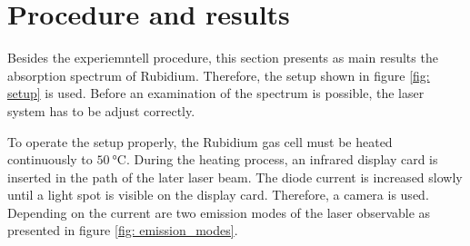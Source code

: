 \section{Procedure and results}\label{sec: procedure}
Besides the experiemntell procedure, this section presents as main results the
absorption spectrum of Rubidium. Therefore, the setup shown in figure \ref{fig: setup}
is used. Before an examination of the spectrum is possible, the laser system has to be
adjust correctly.

To operate the setup properly, the Rubidium gas cell must be heated
continuously to $\SI{50}{\degreeCelsius}$. During the heating process, an infrared display
card is inserted in the path of the later laser beam. The diode current is increased slowly until a
light spot is visible on the display card. Therefore, a camera is used.
Depending on the current are
two emission modes of the laser observable as presented in figure \ref{fig: emission_modes}.
